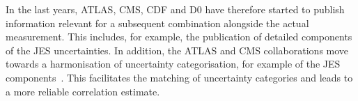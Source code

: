 %
In the last years, \gls{ATLAS}, \gls{CMS}, \gls{CDF} and \gls{D0} have therefore started to publish information relevant for a subsequent combination alongside the actual measurement. This includes, for example, the publication of detailed components of the \gls{JES} uncertainties. In addition, the \gls{ATLAS} and \gls{CMS} collaborations move towards a harmonisation of uncertainty categorisation, for example of the \gls{JES} components~\cite{ATL-PHYS-PUB-2014-020}. This facilitates the matching of uncertainty categories and leads to a more reliable correlation estimate. 





